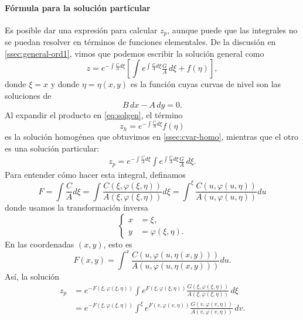 \documentclass[11pt,letterpaper,draft]{report}
\theoremstyle{plain}
\theoremstyle{definition}
\theoremstyle{remark}
\newcommand\<{\langle}
\renewcommand\>{\rangle}
\renewcommand\phi\varphi
\begin{document}
\paragraph{Fórmula para la solución particular}
Es posible dar una expresión para calcular \(z_p\), aunque puede que
las integrales no se puedan resolver en términos de funciones
elementales. De la discusión en \ref{ssec:general-ord1}, vimos que
podemos escribir la solución general como
\begin{equation}
  \label{eq:solgen}
  z
  =
  e^{-\int \frac{C}{A}d\xi}
  \left[
    \int e^{\int \frac{C}{A}d\xi} \tfrac{G}{A} \,d\xi
  +
  f(\eta)
  \right]
,\end{equation}
donde \(\xi=x\) y donde \(\eta=\eta(x,y)\) es la función cuyas curvas
de nivel son las soluciones de
\begin{equation}
  B\,dx - A\,dy = 0.
\end{equation}
Al expandir el producto en \eqref{eq:solgen}, el término
\begin{equation}
  z_h = 
  e^{-\int \frac{C}{A}d\xi} f(\eta)
\end{equation}
es la solución homogénea que obtuvimos en \eqref{ssec:cvar-homo},
mientras que el otro es una solución particular:
\begin{align}
  z_p
  =
  e^{-\int \frac{C}{A}d\xi}
    \int e^{\int \frac{C}{A}d\xi} \tfrac{G}{A} \,d\xi
.\end{align}
Para entender cómo hacer esta integral, definamos
\begin{equation}
  F
  = \int \frac{C}{A}d\xi
  = \int \frac{C(\xi,\phi(\xi,\eta))}{A(\xi,\phi(\xi,\eta))}d\xi
  = \int^\xi \frac{C(u,\phi(u,\eta))}{A(u,\phi(u,\eta))}du
\end{equation}
donde usamos la transformación inversa
\begin{equation}
  \left\{
    \begin{aligned}
      x &= \xi,
      \\
      y &= \phi(\xi,\eta).
    \end{aligned}
  \right.
\end{equation}
En las coordenadas \((x,y)\), esto es
\begin{equation}
  F(x,y)
  = \int^x \frac{C(u,\phi(u,\eta(x,y)))}{A(u,\phi(u,\eta(x,y)))}du.
\end{equation}
Así, la solución
\begin{align}
  z_p
  &=
  e^{-F(\xi,\phi(\xi,\eta))}
    \int
    e^{F(\xi,\phi(\xi,\eta))}
    \tfrac{G(\xi,\phi(\xi,\eta))}{A(\xi,\phi(\xi,\eta))} \,d\xi
    \\
  &=
  e^{-F(\xi,\phi(\xi,\eta))}
    \int^\xi
    e^{F(v,\phi(v,\eta))}
    \tfrac{G(v,\phi(v,\eta))}{A(v,\phi(v,\eta))} \,dv
.\end{align}
\end{document}
